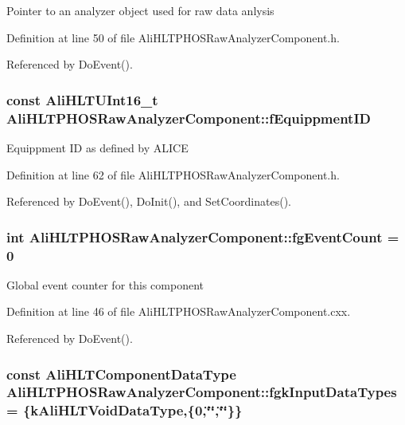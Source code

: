 Pointer to an analyzer object used for raw data anlysis 

Definition at line 50 of file Ali\-HLTPHOSRaw\-Analyzer\-Component.h.

Referenced by Do\-Event().
\subsubsection{\setlength{\rightskip}{0pt plus 5cm}const {\bf Ali\-HLTUInt16\_\-t} {\bf Ali\-HLTPHOSRaw\-Analyzer\-Component::f\-Equippment\-ID}\hspace{0.3cm}{\tt  [private]}}\label{classAliHLTPHOSRawAnalyzerComponent_r0}


Equippment ID as defined by ALICE 

Definition at line 62 of file Ali\-HLTPHOSRaw\-Analyzer\-Component.h.

Referenced by Do\-Event(), Do\-Init(), and Set\-Coordinates().
\subsubsection{\setlength{\rightskip}{0pt plus 5cm}int {\bf Ali\-HLTPHOSRaw\-Analyzer\-Component::fg\-Event\-Count} = 0\hspace{0.3cm}{\tt  [static, private]}}\label{classAliHLTPHOSRawAnalyzerComponent_v0}


Global event counter for this component 

Definition at line 46 of file Ali\-HLTPHOSRaw\-Analyzer\-Component.cxx.

Referenced by Do\-Event().
\subsubsection{\setlength{\rightskip}{0pt plus 5cm}const {\bf Ali\-HLTComponent\-Data\-Type} {\bf Ali\-HLTPHOSRaw\-Analyzer\-Component::fgk\-Input\-Data\-Types} = \{{\bf k\-Ali\-HLTVoid\-Data\-Type},\{0,\char`\"{}\char`\"{},\char`\"{}\char`\"{}\}\}\hspace{0.3cm}{\tt  [static, private]}}\label{classAliHLTPHOSRawAnalyzerComponent_v1}


